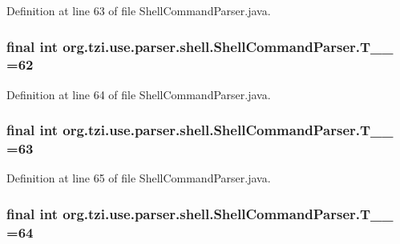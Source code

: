Definition at line 63 of file Shell\-Command\-Parser.\-java.

\hypertarget{classorg_1_1tzi_1_1use_1_1parser_1_1shell_1_1_shell_command_parser_a076539294dbe914f2bfbcf39690de64b}{
\subsubsection[{T\-\_\-\-\_\-62}]{\setlength{\rightskip}{0pt plus 5cm}final int org.\-tzi.\-use.\-parser.\-shell.\-Shell\-Command\-Parser.\-T\-\_\-\-\_ =62\hspace{0.3cm}{\ttfamily [static]}}}\label{classorg_1_1tzi_1_1use_1_1parser_1_1shell_1_1_shell_command_parser_a076539294dbe914f2bfbcf39690de64b}


Definition at line 64 of file Shell\-Command\-Parser.\-java.

\hypertarget{classorg_1_1tzi_1_1use_1_1parser_1_1shell_1_1_shell_command_parser_a106894653a02b29c9ae0c4749202569f}{
\subsubsection[{T\-\_\-\-\_\-63}]{\setlength{\rightskip}{0pt plus 5cm}final int org.\-tzi.\-use.\-parser.\-shell.\-Shell\-Command\-Parser.\-T\-\_\-\-\_ =63\hspace{0.3cm}{\ttfamily [static]}}}\label{classorg_1_1tzi_1_1use_1_1parser_1_1shell_1_1_shell_command_parser_a106894653a02b29c9ae0c4749202569f}


Definition at line 65 of file Shell\-Command\-Parser.\-java.

\hypertarget{classorg_1_1tzi_1_1use_1_1parser_1_1shell_1_1_shell_command_parser_a99fa1ba345600b67e907fe119adf1e58}{
\subsubsection[{T\-\_\-\-\_\-64}]{\setlength{\rightskip}{0pt plus 5cm}final int org.\-tzi.\-use.\-parser.\-shell.\-Shell\-Command\-Parser.\-T\-\_\-\-\_ =64\hspace{0.3cm}{\ttfamily [static]}}}\label{classorg_1_1tzi_1_1use_1_1parser_1_1shell_1_1_shell_command_parser_a99fa1ba345600b67e907fe119adf1e58}



